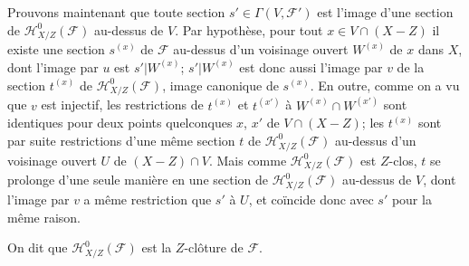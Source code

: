 Prouvons maintenant que toute section $s'\in\Gamma(V,\mathcal F')$ est
l'image d'une section de $\mathcal H^0_{X/Z}(\mathcal F)$ au-dessus de $V$.
Par hypothèse, pour tout $x\in V\cap(X-Z)$ il existe une section $s^{(x)}$
de $\mathcal F$ au-dessus d'un voisinage ouvert $W^{(x)}$ de $x$ dans $X$,
dont l'image par $u$ est $s'|W^{(x)}$; $s'|W^{(x)}$ est donc aussi l'image
par $v$ de la section $t^{(x)}$ de $\mathcal H^0_{X/Z}(\mathcal F)$, image
canonique de $s^{(x)}$. En outre, comme on a vu que $v$ est injectif, les
restrictions de $t^{(x)}$ et $t^{(x')}$ à $W^{(x)}\cap W^{(x')}$ sont
identiques pour deux points quelconques $x$, $x'$ de $V\cap(X-Z)$; les
$t^{(x)}$ sont par suite restrictions d'une même section $t$ de
$\mathcal H^0_{X/Z}(\mathcal F)$ au-dessus d'un voisinage ouvert $U$ de
$(X-Z)\cap V$. Mais comme $\mathcal H^0_{X/Z}(\mathcal F)$ est $Z$-clos,
$t$ se prolonge d'une seule manière en une section de
$\mathcal H^0_{X/Z}(\mathcal F)$ au-dessus de $V$, dont l'image par $v$ a
même restriction que $s'$ à $U$, et coïncide donc avec $s'$ pour la même
raison.

On dit que $\mathcal H^0_{X/Z}(\mathcal F)$ est la $Z$-clôture de
$\mathcal F$.


